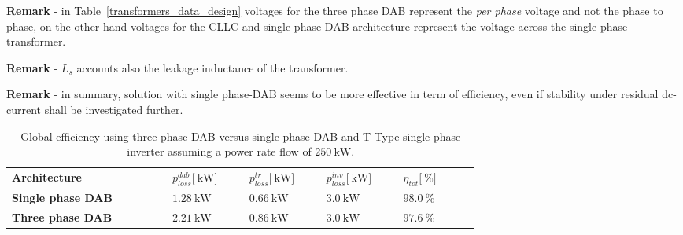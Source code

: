 \documentclass[12pt,a4paper]{scrartcl}
\begin{document}
\begin{onehalfspace}
\noindent\textbf{Remark} - in Table~\ref{transformers_data_design} voltages for the three phase DAB represent the \textit{per phase} voltage and not the phase to phase, on the other hand voltages for the CLLC and single phase DAB architecture represent the voltage across the single phase transformer.

\noindent\textbf{Remark} - $L_s$  accounts also the leakage inductance of the transformer.

\noindent\textbf{Remark} - in summary, solution with single phase-DAB seems to be more effective in term of efficiency, even if stability under residual dc-current shall be investigated further.
   
\begin{center}	
	\doublespacing
	\begin{longtable}{p{0.25\linewidth}|p{0.12\linewidth}|p{0.12\linewidth}|p{0.12\linewidth}|p{0.12\linewidth}}
		\captionsetup{width=0.65\textwidth, font=small}
		\caption{Global efficiency using three phase DAB versus single phase DAB and T-Type single phase inverter assuming a power rate flow of $\SI{250}{\kilo\watt}$.}
		\label{global_efficiency} \\
		\hline\hline
		\textbf{Architecture} & \hspace*{\fill} $p_{loss}^{dab}\big[\SI{}{\kilo\watt}\big]$  & \hspace*{\fill} $p_{loss}^{tr}\big[\SI{}{\kilo\watt}\big]$ & \hspace*{\fill}  $p_{loss}^{inv}\big[\SI{}{\kilo\watt}\big]$ & \hspace*{\fill}  $\eta_{tot}\big[\SI{}{\percent}\big]$\\
		\hline
		\textbf{Single phase DAB} & \hspace*{\fill} $\SI{1.28}{\kilo\watt}$ & \hspace*{\fill} $\SI{0.66}{\kilo\watt}$  & \hspace*{\fill} $\SI{3.0}{\kilo\watt}$  & \hspace*{\fill} $\SI{98.0}{\percent}$ \\
		\hline
		\textbf{Three phase DAB} & \hspace*{\fill} $\SI{2.21}{\kilo\watt}$ & \hspace*{\fill} $\SI{0.86}{\kilo\watt}$  & \hspace*{\fill} $\SI{3.0}{\kilo\watt}$  & \hspace*{\fill} $\SI{97.6}{\percent}$ \\
		\hline\hline
	\end{longtable}
\end{center}



\end{onehalfspace}
\end{document}
